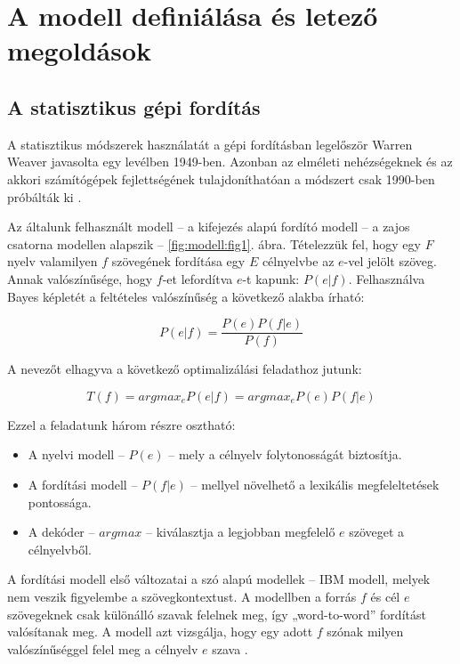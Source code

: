 \section{A modell definiálása és letező megoldások} \label{sec:model_definition}



\subsection{A statisztikus gépi fordítás}

A statisztikus módszerek használatát a gépi fordításban legelőször Warren Weaver javasolta egy levélben 1949-ben. Azonban az elméleti nehézségeknek és az akkori számítógépek fejlettségének tulajdoníthatóan a módszert csak 1990-ben próbálták ki \cite{Brown:1990:SAM:92858.92860}.

Az általunk felhasznált modell -- a kifejezés alapú fordító modell -- a zajos csatorna modellen alapszik -- \ref{fig:modell:fig1}. ábra. Tételezzük fel, hogy egy $F$ nyelv valamilyen $f$ szövegének fordítása egy $E$ célnyelvbe az $e$-vel jelölt szöveg. Annak valószínűsége, hogy $f$-et lefordítva $e$-t kapunk: $P(e|f)$. Felhasználva Bayes képletét a feltételes valószínűség a következő alakba írható:

\begin{equation}
	P(e|f) = \frac{P(e)P(f|e)}{P(f)}
\end{equation}

A nevezőt elhagyva a következő optimalizálási feladathoz jutunk:

\begin{equation}
	T(f) = argmax_e P(e|f) = argmax_e P(e)P(f|e)
\end{equation} 

Ezzel a feladatunk három részre osztható: 
\begin{itemize}
	\item
		A nyelvi modell --  $P(e)$ -- mely a célnyelv folytonosságát biztosítja.
	\item
		A fordítási modell --  $P(f|e)$ -- mellyel növelhető a lexikális megfeleltetések pontossága.
	\item
		A dekóder -- $argmax$ -- kiválasztja a legjobban megfelelő $e$ szöveget a célnyelvből.
\end{itemize}

A fordítási modell első változatai a szó alapú modellek -- IBM modell, melyek nem veszik figyelembe a szövegkontextust. A modellben a forrás $f$ és cél $e$ szövegeknek csak különálló szavak felelnek meg, így „word-to-word” fordítást valósítanak meg. A modell azt vizsgálja, hogy egy adott $f$ szónak milyen valószínűséggel felel meg a célnyelv $e$ szava \cite{Brown:1990:SAM:92858.92860} \cite{Berger:1994}.

